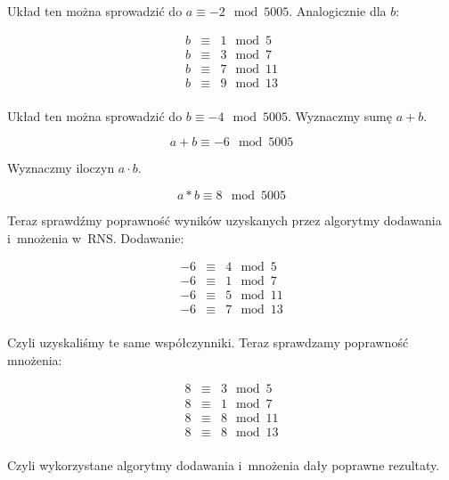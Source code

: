 \documentclass[a4paper,10pt, twocolumn]{article}
\begin{document}
\noindent Układ ten można sprowadzić do $a \equiv -2 \mod 5005$. Analogicznie dla $b$:

\begin{equation*}
 \begin{array}{lcl}b & \equiv & 1 \mod 5 \\ b & \equiv & 3 \mod 7 \\ b & \equiv & 7 \mod 11 \\ b & \equiv & 9 \mod 13 \\ \end{array}
\end{equation*}

\noindent Układ ten można sprowadzić do $b \equiv -4 \mod 5005$. Wyznaczmy sumę $a + b$.

\begin{equation*}
 a + b \equiv -6 \mod 5005
\end{equation*}

\noindent Wyznaczmy iloczyn $a \cdot b$.

\begin{equation*}
 a * b \equiv 8 \mod 5005
\end{equation*}

\noindent Teraz sprawdźmy poprawność wyników uzyskanych przez algorytmy dodawania i~mnożenia w~RNS. Dodawanie:

\begin{equation*}
 \begin{array}{lcl} -6 & \equiv & 4 \mod 5 \\
 -6 & \equiv & 1 \mod 7 \\
 -6 & \equiv & 5 \mod 11 \\
 -6 & \equiv & 7 \mod 13\\
 \end{array}
\end{equation*}

\noindent Czyli uzyskaliśmy te same współczynniki. Teraz sprawdzamy poprawność mnożenia:

\begin{equation*}
 \begin{array}{lcl} 8 & \equiv & 3 \mod 5 \\
 8 & \equiv & 1 \mod 7 \\
 8 & \equiv & 8 \mod 11 \\
 8 & \equiv & 8 \mod 13 \\
 \end{array}
\end{equation*}

\noindent Czyli wykorzystane algorytmy dodawania i~mnożenia dały poprawne rezultaty.
\end{document}
